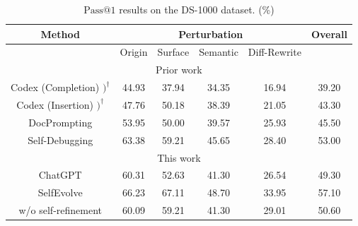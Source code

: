 \documentclass[a4paper,oneside]{book}
\begin{document}
\begin{table}[H]
    \caption{$\text{Pass@1}$ results on the DS-1000 dataset. (\%)}\label{tab:ds1000_results}
    \begin{center}
        \begin{tabular}{|c|c|c|c|c|c|}
            \hline
            \multirow[b]{2}{*}{Method}       & \multicolumn{4}{|c|}{Perturbation} & \multirow{2}{*}{Overall}                                   \\
            \hline
                                             & Origin                             & Surface                  & Semantic & Diff-Rewrite &       \\
            \hline
            \multicolumn{6}{|c|}{Prior work}                                                                                                   \\
            \hline
            Codex (Completion) $)^{\dagger}$ & 44.93                              & 37.94                    & 34.35    & 16.94        & 39.20 \\
            \hline
            Codex (Insertion) $)^{\dagger}$  & 47.76                              & 50.18                    & 38.39    & 21.05        & 43.30 \\
            \hline
            DocPrompting                     & 53.95                              & 50.00                    & 39.57    & 25.93        & 45.50 \\
            \hline
            Self-Debugging                   & 63.38                              & 59.21                    & 45.65    & 28.40        & 53.00 \\
            \hline
            \multicolumn{6}{|c|}{This work}                                                                                                    \\
            \hline
            ChatGPT                          & 60.31                              & 52.63                    & 41.30    & 26.54        & 49.30 \\
            \hline
            SelfEvolve                       & 66.23                              & 67.11                    & 48.70    & 33.95        & 57.10 \\
            \hline
            w/o self-refinement              & 60.09                              & 59.21                    & 41.30    & 29.01        & 50.60 \\
            \hline
        \end{tabular}
    \end{center}
\end{table}
\end{document}
